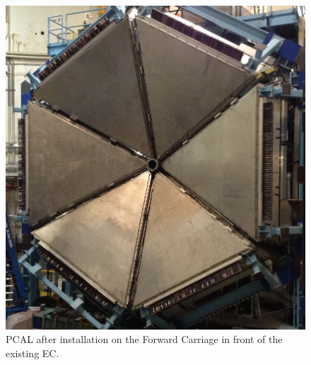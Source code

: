 \documentclass[final,3p,twocolumn]{elsarticle}
\begin{document}
\begin{figure}[tp!]
\centerline{\includegraphics[width=0.95\columnwidth]{PCAL.png}}
\caption{PCAL after installation on the Forward Carriage in front of the existing EC.}
\label{ec-pcal}
\end{figure}
\end{document}
